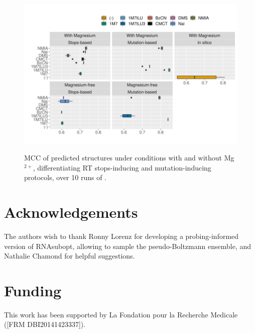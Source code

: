 \documentclass[a4,center,fleqn]{NAR}
\newcommand{\Software}[1]{\text{\ttfamily\bfseries #1}}
\newcommand{\OurTool}{\Software{IPANEMAP}\xspace}
\begin{document}
\begin{figure}
	{\centering\includegraphics[width=1\linewidth]{graphs/boxplotreproducibility.png}\\}
	
	\caption{MCC of predicted structures under conditions with and without Mg$^{2+}$, differentiating RT stops-inducing and mutation-inducing protocols, over 10 runs of \OurTool{}. }\label{fig:reproducibility}
\end{figure}




%
%
%
%
%	
%	


\section*{Acknowledgements}
The authors wish to thank Ronny Lorenz for developing a probing-informed version of RNAsubopt, allowing to sample the pseudo-Boltzmann ensemble, and Nathalie Chamond for helpful suggestions.

\section*{Funding}
This work has been supported by La Fondation pour la Recherche Medicale ([FRM
DBI20141423337]).
%


\end{document}
